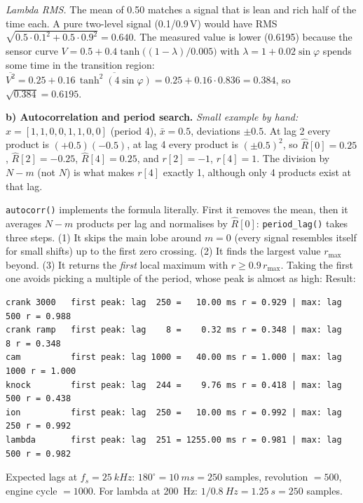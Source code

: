 \begin{solution}
\emph{Lambda RMS.} The mean of 0.50 matches a signal that is lean and rich
half of the time each. A pure two-level signal (0.1/0.9\,V) would have
RMS $\sqrt{0.5\cdot0.1^2+0.5\cdot0.9^2}=0.640$. The measured value is
lower (0.6195) because the sensor curve
$V=0.5+0.4\tanh\bigl((1-\lambda)/0.005\bigr)$ with
$\lambda=1+0.02\sin\varphi$ spends some time in the transition region:
$\overline{V^2}=0.25+0.16\,\overline{\tanh^2(4\sin\varphi)}=0.25+0.16\cdot0.836=0.384$,
so $\sqrt{0.384}=0.6195$.

\textbf{b) Autocorrelation and period search.}
\emph{Small example by hand:} $x=[1,1,0,0,1,1,0,0]$ (period 4), $\bar x=0.5$,
deviations $\pm0.5$. At lag 2 every product is $(+0.5)(-0.5)$, at lag 4 every
product is $(\pm0.5)^2$, so $\hat R[0]=0.25$, $\hat R[2]=-0.25$,
$\hat R[4]=0.25$, and $r[2]=-1$, $r[4]=1$. The division by $N-m$ (not $N$) is
what makes $r[4]$ exactly 1, although only 4 products exist at that lag.

\texttt{autocorr()} implements the formula literally. First it removes the
mean, then it averages $N-m$ products per lag and normalises by $\hat R[0]$:
\texttt{period\_lag()} takes three steps. (1) It skips the main lobe around
$m=0$ (every signal resembles itself for small shifts) up to the first zero
crossing. (2) It finds the largest value $r_{\max}$ beyond. (3) It returns the
\emph{first} local maximum with $r\ge0.9\,r_{\max}$. Taking the first one
avoids picking a multiple of the period, whose peak is almost as high:
Result:
\begin{lstlisting}[style=shell,numbers=none]
crank 3000   first peak: lag  250 =   10.00 ms r = 0.929 | max: lag  500 r = 0.988
crank ramp   first peak: lag    8 =    0.32 ms r = 0.348 | max: lag    8 r = 0.348
cam          first peak: lag 1000 =   40.00 ms r = 1.000 | max: lag 1000 r = 1.000
knock        first peak: lag  244 =    9.76 ms r = 0.418 | max: lag  500 r = 0.438
ion          first peak: lag  250 =   10.00 ms r = 0.992 | max: lag  250 r = 0.992
lambda       first peak: lag  251 = 1255.00 ms r = 0.981 | max: lag  500 r = 0.982
\end{lstlisting}
Expected lags at $f_s=\SI{25}{kHz}$: $180^\circ=\SI{10}{ms}=250$ samples,
revolution $=500$, engine cycle $=1000$. For lambda at \SI{200}{Hz}:
$1/\SI{0.8}{Hz}=\SI{1.25}{s}=250$ samples.


\end{solution}
